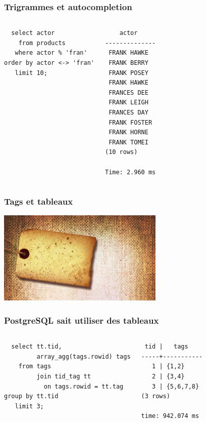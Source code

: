 \documentclass{beamer}
\begin{document}
\begin{frame}[fragile]
  \frametitle{Trigrammes et autocompletion}

\begin{columns}
\begin{verbatim}
  select actor
    from products
   where actor % 'fran'
order by actor <-> 'fran'
   limit 10;
\end{verbatim}  
\begin{verbatim}
    actor     
--------------
 FRANK HAWKE
 FRANK BERRY
 FRANK POSEY
 FRANK HAWKE
 FRANCES DEE
 FRANK LEIGH
 FRANCES DAY
 FRANK FOSTER
 FRANK HORNE
 FRANK TOMEI
(10 rows)

Time: 2.960 ms
\end{verbatim}  
\end{columns}
\end{frame}

\begin{frame}[fragile]
  \frametitle{Tags et tableaux}

\begin{center}
  \includegraphics[height=12em]{wordpres-seo-categories-tags.jpg}
\end{center}
\end{frame}

\begin{frame}[fragile]
  \frametitle{PostgreSQL sait utiliser des tableaux}

\begin{columns}
\begin{verbatim}
  select tt.tid,
         array_agg(tags.rowid) tags
    from tags
         join tid_tag tt
           on tags.rowid = tt.tag
group by tt.tid
   limit 3;
\end{verbatim}  
\begin{verbatim}
 tid |   tags    
-----+-----------
   1 | {1,2}
   2 | {3,4}
   3 | {5,6,7,8}
(3 rows)

time: 942.074 ms
\end{verbatim}  
\end{columns}
\end{frame}
\end{document}
